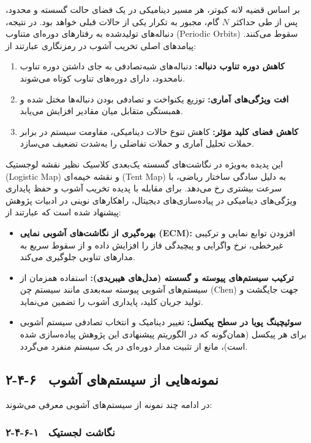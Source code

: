 بر اساس قضیه لانه کبوتر، هر مسیر دینامیکی در یک فضای حالت گسسته و محدود، پس از طی حداکثر $N$ گام، مجبور به تکرار یکی از حالات قبلی خواهد بود. در نتیجه، دنباله‌های تولیدشده به رفتارهای دوره‌ای متناوب (‎Periodic Orbits‎) سقوط می‌کنند. پیامدهای اصلی تخریب آشوب در رمزنگاری عبارتند از:
\begin{enumerate}
    \item \textbf{کاهش دوره تناوب دنباله:} دنباله‌های شبه‌تصادفی به جای داشتن دوره تناوب نامحدود، دارای دوره‌های تناوب کوتاه می‌شوند.
    \item \textbf{افت ویژگی‌های آماری:} توزیع یکنواخت و تصادفی بودن دنباله‌ها مختل شده و همبستگی متقابل میان مقادیر افزایش می‌یابد.
    \item \textbf{کاهش فضای کلید مؤثر:} کاهش تنوع حالات دینامیکی، مقاومت سیستم در برابر حملات تحلیل آماری و حملات تفاضلی را به‌شدت تضعیف می‌سازد.
\end{enumerate}

این پدیده به‌ویژه در نگاشت‌های گسسته یک‌بعدی کلاسیک نظیر نقشه لوجستیک (‎Logistic Map‎) و نقشه خیمه‌ای (‎Tent Map‎) به دلیل سادگی ساختار ریاضی، با سرعت بیشتری رخ می‌دهد. برای مقابله با پدیده تخریب آشوب و حفظ پایداری ویژگی‌های دینامیکی در پیاده‌سازی‌های دیجیتال، راهکارهای نوینی در ادبیات پژوهش پیشنهاد شده است که عبارتند از:
\begin{itemize}
    \item \textbf{بهره‌گیری از نگاشت‌های آشوبی نمایی (‎ECM‎):} افزودن توابع نمایی و ترکیبی غیرخطی، نرخ واگرایی و پیچیدگی فاز را افزایش داده و از سقوط سریع به مدارهای تناوبی جلوگیری می‌کند.
    \item \textbf{ترکیب سیستم‌های پیوسته و گسسته (مدل‌های هیبریدی):} استفاده همزمان از سیستم‌های آشوبی پیوسته سه‌بعدی مانند سیستم چن (‎Chen‎) جهت جایگشت و تولید جریان کلید، پایداری آشوب را تضمین می‌نماید.
    \item \textbf{سوئیچینگ پویا در سطح پیکسل:} تغییر دینامیک و انتخاب تصادفی سیستم آشوبی برای هر پیکسل (همان‌گونه که در الگوریتم پیشنهادی این پژوهش پیاده‌سازی شده است)، مانع از تثبیت مدار دوره‌ای در یک سیستم منفرد می‌گردد.
\end{itemize}

\subsection{۲-۴-۶  نمونه‌هایی از سیستم‌های آشوب}

در ادامه چند نمونه از سیستم‌های آشوبی معرفی می‌شوند:

\subsubsection{۲-۴-۶-۱  نگاشت لجستیک}

